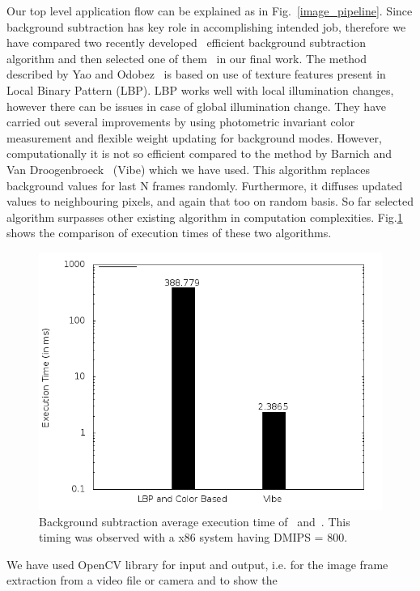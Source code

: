 \documentclass[conference]{IEEEtran}
\begin{document}
\indent Our top level application flow can be explained as in
Fig.~\ref{image_pipeline}.  Since background subtraction has key role in
accomplishing intended job, therefore we have compared two recently
developed~\cite{3, 5} efficient background subtraction algorithm and
then selected one of them~\cite{5} in our final work.  The method
described by Yao and Odobez~\cite{3} is based on use of texture features
present in Local Binary Pattern (LBP).  LBP works well with local
illumination changes, however there can be issues in case of global
illumination change. They have carried out several improvements by using
photometric invariant color measurement and flexible weight updating for
background modes. However, computationally it is not so efficient
compared to the method by Barnich and Van Droogenbroeck~\cite{5} (Vibe)
which we have used. This algorithm replaces background values for last N
frames randomly.  Furthermore, it diffuses updated values to
neighbouring pixels, and again that too on random basis. So far selected
algorithm surpasses other existing algorithm in computation
complexities. Fig.\ref{bg_compare} shows the comparison of execution
times of these two algorithms.\\
\begin{figure}[!h]
\centering
\includegraphics[scale=0.35]{figures/bg_compare}
\caption{Background subtraction average execution time of~\cite{3}
and~\cite{5}. This timing was observed with a x86 system having DMIPS =
800.}
\label{bg_compare}
\end{figure}
\indent We have used OpenCV library for input and output, i.e.  for
the image frame extraction from a video file or camera and to show the
\end{document}
